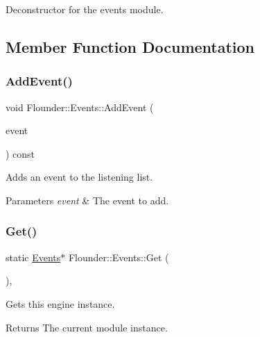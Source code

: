 Deconstructor for the events module. 



\subsection{Member Function Documentation}
\mbox{\label{class_flounder_1_1_events_a827cd4a1dc6cbff2441e9484e5062e9d}} 
\subsubsection{\texorpdfstring{Add\+Event()}{AddEvent()}}
{\footnotesize\ttfamily void Flounder\+::\+Events\+::\+Add\+Event (\begin{DoxyParamCaption}\item[{\hyperlink{class_flounder_1_1_i_event}{I\+Event} $\ast$}]{event }\end{DoxyParamCaption}) const}



Adds an event to the listening list. 


\begin{DoxyParams}{Parameters}
{\em event} & The event to add. \\
\hline
\end{DoxyParams}
\mbox{\label{class_flounder_1_1_events_ac57b32d7e516abf96991cc764072a0b3}} 
\subsubsection{\texorpdfstring{Get()}{Get()}}
{\footnotesize\ttfamily static \hyperlink{class_flounder_1_1_events}{Events}$\ast$ Flounder\+::\+Events\+::\+Get (\begin{DoxyParamCaption}{ }\end{DoxyParamCaption})\hspace{0.3cm}{\ttfamily [inline]}, {\ttfamily [static]}}



Gets this engine instance. 

\begin{DoxyReturn}{Returns}
The current module instance. 
\end{DoxyReturn}
\mbox{\label{class_flounder_1_1_events_aaf73c654b75a06db59eecb45e3ac6cee}} 

